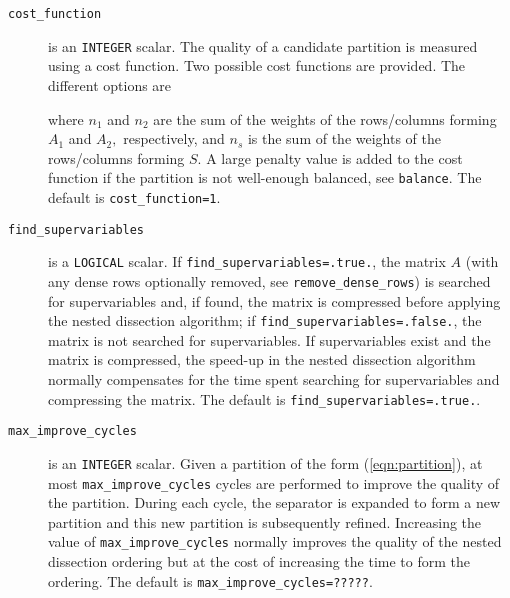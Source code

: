 \begin{description}
\item[\texttt{cost\_function}] is an {\tt INTEGER} scalar. The quality of a candidate 
 partition is measured using a cost function. Two possible 
 cost functions are provided. The different options are 
 where $n_1$ and $n_2$ are the sum of the weights of the rows/columns forming 
 $A_1$ and $A_2,$ respectively, and $n_s$ is the sum of the weights of the 
 rows/columns forming $S.$ A large penalty value is added to the cost function if the 
partition is not well-enough balanced, see {\tt balance}. The default is {\tt cost\_function=1}.

\item[\texttt{find\_supervariables}] is a {\tt LOGICAL} scalar. If 
{\tt find\_supervariables=.true.}, the matrix $A$ (with any dense rows 
optionally removed, see {\tt remove\_dense\_rows}) is searched for 
supervariables and, if found, the matrix is compressed before applying the 
nested dissection algorithm; if {\tt find\_supervariables=.false.}, the matrix 
is not searched for supervariables. If supervariables exist and the matrix is 
compressed, the speed-up in the nested dissection algorithm normally 
compensates for the time spent searching for supervariables and compressing the 
matrix. The default is {\tt find\_supervariables=.true.}.



\item[\texttt{max\_improve\_cycles}] is an {\tt INTEGER} scalar. Given a partition of the 
form (\ref{eqn:partition}), at most {\tt max\_improve\_cycles} cycles are 
performed to improve the quality of the partition. During each cycle, the 
separator is expanded to form a new partition and this new partition is 
subsequently refined. Increasing the value of {\tt max\_improve\_cycles} normally improves 
the quality of the nested dissection ordering but at the cost of increasing the 
time to form the ordering. The default is {\tt max\_improve\_cycles=?????}.


\end{description}
